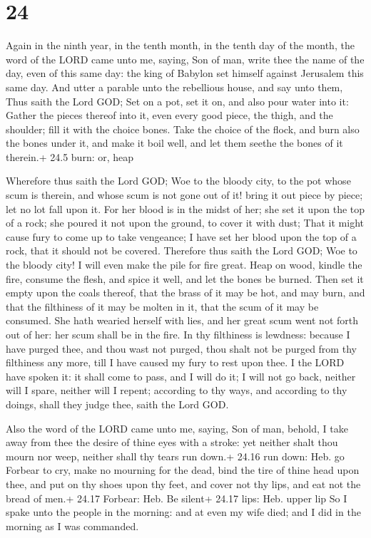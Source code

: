\hypertarget{section-23}{%
\section{24}\label{section-23}}

 Again in the ninth year, in the tenth month, in the tenth
day of the month, the word of the LORD came unto me, saying,
 Son of man, write thee the name of the day, even of this
same day: the king of Babylon set himself against Jerusalem this same
day.  And utter a parable unto the rebellious house, and say
unto them, Thus saith the Lord GOD; Set on a pot, set it on, and also
pour water into it:  Gather the pieces thereof into it, even
every good piece, the thigh, and the shoulder; fill it with the choice
bones.  Take the choice of the flock, and burn also the
bones under it, and make it boil well, and let them seethe the bones of
it therein.+ 24.5 burn: or, heap

 Wherefore thus saith the Lord GOD; Woe to the bloody
city, to the pot whose scum is therein, and whose scum is not gone out
of it! bring it out piece by piece; let no lot fall upon it.
 For her blood is in the midst of her; she set it upon the
top of a rock; she poured it not upon the ground, to cover it with dust;
 That it might cause fury to come up to take vengeance; I
have set her blood upon the top of a rock, that it should not be
covered.  Therefore thus saith the Lord GOD; Woe to the
bloody city! I will even make the pile for fire great. 
Heap on wood, kindle the fire, consume the flesh, and spice it well, and
let the bones be burned.  Then set it empty upon the coals
thereof, that the brass of it may be hot, and may burn, and that the
filthiness of it may be molten in it, that the scum of it may be
consumed.  She hath wearied herself with lies, and her
great scum went not forth out of her: her scum shall be in the fire.
 In thy filthiness is lewdness: because I have purged thee,
and thou wast not purged, thou shalt not be purged from thy filthiness
any more, till I have caused my fury to rest upon thee.  I
the LORD have spoken it: it shall come to pass, and I will do it; I will
not go back, neither will I spare, neither will I repent; according to
thy ways, and according to thy doings, shall they judge thee, saith the
Lord GOD.

 Also the word of the LORD came unto me, saying,
 Son of man, behold, I take away from thee the desire of
thine eyes with a stroke: yet neither shalt thou mourn nor weep, neither
shall thy tears run down.+ 24.16 run down: Heb. go  Forbear
to cry, make no mourning for the dead, bind the tire of thine head upon
thee, and put on thy shoes upon thy feet, and cover not thy lips, and
eat not the bread of men.+ 24.17 Forbear: Heb. Be silent+ 24.17 lips:
Heb. upper lip  So I spake unto the people in the morning:
and at even my wife died; and I did in the morning as I was commanded.

